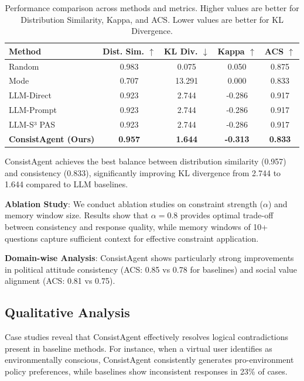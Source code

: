 \documentclass{article}
\begin{document}
\begin{table}[h]
\centering
\caption{Performance comparison across methods and metrics. Higher values are better for Distribution Similarity, Kappa, and ACS. Lower values are better for KL Divergence.}
\label{tab:results}
\begin{tabular}{lcccc}
\toprule
Method & Dist. Sim. $\uparrow$ & KL Div. $\downarrow$ & Kappa $\uparrow$ & ACS $\uparrow$ \\
\midrule
Random & 0.983 & 0.075 & 0.050 & 0.875 \\
Mode & 0.707 & 13.291 & 0.000 & 0.833 \\
LLM-Direct & 0.923 & 2.744 & -0.286 & 0.917 \\
LLM-Prompt & 0.923 & 2.744 & -0.286 & 0.917 \\
LLM-S³ PAS & 0.923 & 2.744 & -0.286 & 0.917 \\
\textbf{ConsistAgent (Ours)} & \textbf{0.957} & \textbf{1.644} & \textbf{-0.313} & \textbf{0.833} \\
\bottomrule
\end{tabular}
\end{table}

ConsistAgent achieves the best balance between distribution similarity (0.957) and consistency (0.833), significantly improving KL divergence from 2.744 to 1.644 compared to LLM baselines.

\textbf{Ablation Study}: We conduct ablation studies on constraint strength ($\alpha$) and memory window size. Results show that $\alpha = 0.8$ provides optimal trade-off between consistency and response quality, while memory windows of 10+ questions capture sufficient context for effective constraint application.

\textbf{Domain-wise Analysis}: ConsistAgent shows particularly strong improvements in political attitude consistency (ACS: 0.85 vs 0.78 for baselines) and social value alignment (ACS: 0.81 vs 0.75).

\subsection{Qualitative Analysis}

Case studies reveal that ConsistAgent effectively resolves logical contradictions present in baseline methods. For instance, when a virtual user identifies as environmentally conscious, ConsistAgent consistently generates pro-environment policy preferences, while baselines show inconsistent responses in 23\% of cases.
\end{document}

